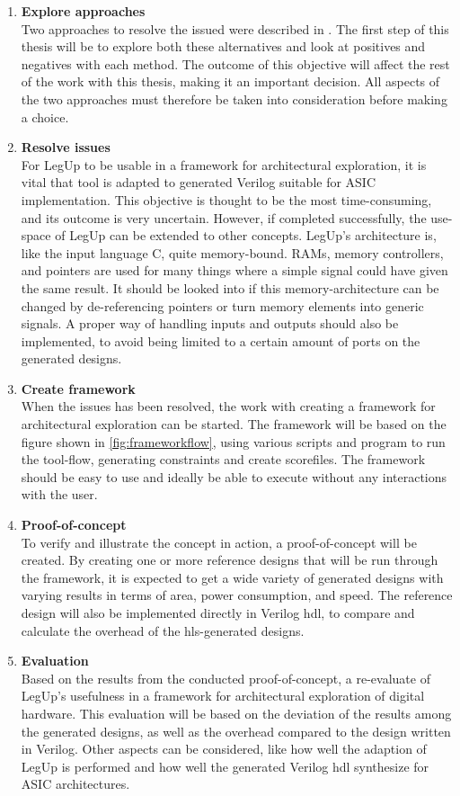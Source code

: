 \newcommand\litem[1]{\item{\bfseries #1\\}}
\begin{enumerate}
\litem{Explore approaches} Two approaches to resolve the issued were described in \cite{holm2015pro}. The first step of this thesis will be to explore both these alternatives and look at positives and negatives with each method. The outcome of this objective will affect the rest of the work with this thesis, making it an important decision. All aspects of the two approaches must therefore be taken into consideration before making a choice.
\litem{Resolve issues} For LegUp to be usable in a framework for architectural exploration, it is vital that tool is adapted to generated Verilog suitable for ASIC implementation. This objective is thought to be the most time-consuming, and its outcome is very uncertain. However, if completed successfully, the use-space of LegUp can be extended to other concepts. LegUp’s architecture is, like the input language C, quite memory-bound. RAMs, memory controllers, and pointers are used for many things where a simple signal could have given the same result. It should be looked into if this memory-architecture can be changed by de-referencing pointers or turn memory elements into generic signals. A proper way of handling inputs and outputs should also be implemented, to avoid being limited to a certain amount of ports on the generated designs.
\litem{Create framework} When the issues has been resolved, the work with creating a framework for architectural exploration can be started. The framework will be based on the figure shown in \cref{fig:frameworkflow}, using various scripts and program to run the tool-flow, generating constraints and create scorefiles. The framework should be easy to use and ideally be able to execute without any interactions with the user.
\litem{Proof-of-concept} To verify and illustrate the concept in action, a proof-of-concept will be created. By creating one or more reference designs that will be run through the framework, it is expected to get a wide variety of generated designs with varying results in terms of area, power consumption, and speed. The reference design will also be implemented directly in Verilog \gls{hdl}, to compare and calculate the overhead of the \gls{hls}-generated designs.
\litem{Evaluation} Based on the results from the conducted proof-of-concept, a re-evaluate of LegUp's usefulness in a framework for architectural exploration of digital hardware. This evaluation will be based on the deviation of the results among the generated designs, as well as the overhead compared to the design written in Verilog. Other aspects can be considered, like how well the adaption of LegUp is performed and how well the generated Verilog \gls{hdl} synthesize for ASIC architectures.

\end{enumerate}

